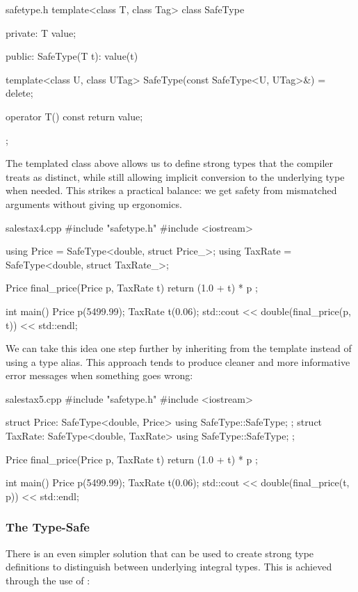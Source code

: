 \documentclass[12pt]{article}
\begin{document}
\begin{cxx}{safetype.h}
template<class T, class Tag>
class SafeType
{
private:
	T value;

public:
	SafeType(T t): value(t) {}
	
	template<class U, class UTag>
	SafeType(const SafeType<U, UTag>&) = delete;

	operator T() const { return value; }
};
\end{cxx}

\noindent
The templated class above allows us to define strong types that the compiler treats as distinct, while still allowing implicit conversion to the underlying type when needed.
This strikes a practical balance: we get safety from mismatched arguments without giving up ergonomics.

\begin{cxx}{salestax4.cpp}
#include "safetype.h"
#include <iostream>

using Price = SafeType<double, struct Price_>;
using TaxRate = SafeType<double, struct TaxRate_>;

Price final_price(Price p, TaxRate t)
{
	return { (1.0 + t) * p };
}

int main()
{
	Price p(5499.99);
	TaxRate t(0.06);
	std::cout << double(final_price(p, t)) << std::endl;
}
\end{cxx}

\noindent
We can take this idea one step further by inheriting from the  template instead of using a type alias.
This approach tends to produce cleaner and more informative error messages when something goes wrong:

\begin{cxx}{salestax5.cpp}
#include "safetype.h"
#include <iostream>

struct Price: SafeType<double, Price> { using SafeType::SafeType; };
struct TaxRate: SafeType<double, TaxRate> { using SafeType::SafeType; };

Price final_price(Price p, TaxRate t)
{
	return { (1.0 + t) * p };
}

int main()
{
	Price p(5499.99);
	TaxRate t(0.06);
	std::cout << double(final_price(t, p)) << std::endl;
}
\end{cxx}

\subsubsection{The Type-Safe }

There is an even simpler solution that can be used to create strong type definitions to distinguish between underlying integral types.
This is achieved through the use of :
\end{document}

